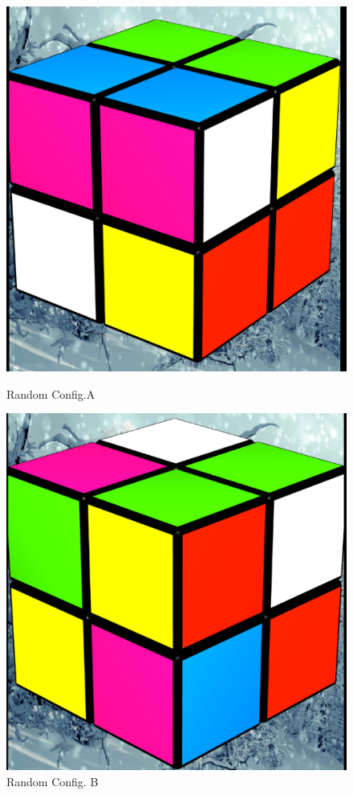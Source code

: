 \documentclass{article}
\begin{document}
\begin{figure}[!h]
  \centering
  \begin{minipage}[b]{0.4\textwidth}
    \includegraphics[width=\textwidth]{pics/Capture6.PNG}
    \caption{Random Config.A}
  \end{minipage}
  \hfill
  \begin{minipage}[b]{0.4\textwidth}
    \includegraphics[width=\textwidth]{pics/Capture8.PNG}
    \caption{Random Config. B}
  \end{minipage}
\end{figure}
\end{document}
